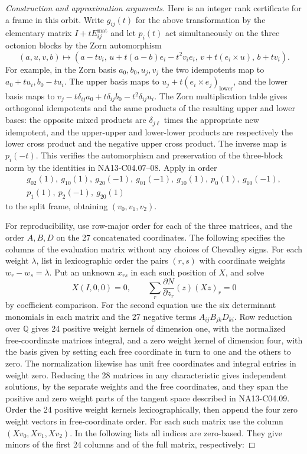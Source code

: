 \documentclass[11pt,a4paper,openany,oneside]{book}
\theoremstyle{resultstyle}
\theoremstyle{definition}
\numberwithin{equation}{chapter}
\begin{document}
\begin{proof}[Construction and approximation arguments]
Here is an integer rank certificate for a frame in this orbit.
Write \(g_{ij}(t)\) for the above transformation by the elementary
matrix \(I+tE^{\mathrm{mat}}_{ij}\) and let \(p_i(t)\) act
simultaneously on the three octonion blocks by the Zorn
automorphism
\[
 (a,u,v,b)\longmapsto
 \left(a-tv_i,\,
   u+t(a-b)e_i-t^2v_i e_i,\,
   v+t(e_i\times u),\, b+tv_i\right).
\]
For example, in the Zorn basis \(a_0,b_0,u_j,v_j\) the two
idempotents map to \(a_0+t u_i,b_0-t u_i\). The upper basis
maps to \(u_j+t(e_i\times e_j)_{\mathrm{lower}}\), and the lower
basis maps to \(v_j-t\delta_{ij}a_0+t\delta_{ij}b_0-
t^2\delta_{ij}u_i\). The Zorn multiplication table gives
orthogonal idempotents and the same products of the resulting
upper and lower bases: the opposite mixed products are
\(\delta_{j\ell}\) times the appropriate new idempotent,
and the upper-upper and lower-lower products are respectively
the lower cross product and the negative upper cross product.
The inverse map is \(p_i(-t)\). This verifies the automorphism
and preservation of the three-block norm by the identities in
NA13-C04.07--08. Apply in order
\[
\begin{gathered}
 g_{02}(1),\ g_{10}(1),\ g_{20}(-1),\ g_{01}(-1),\
 g_{10}(1),\ p_0(1),\ g_{10}(-1),\\
 p_1(1),\ p_2(-1),\ g_{20}(1)
\end{gathered}
\]
to the split frame, obtaining \((v_0,v_1,v_2)\).

For reproducibility, use row-major order for each of the three
matrices, and the order \(A,B,D\) on the 27 concatenated coordinates.
The following specifies the columns of the evaluation matrix without
any choices of Chevalley signs. For each weight \(\lambda\), list in
lexicographic order the pairs \((r,s)\) with coordinate weights
\(w_r-w_s=\lambda\). Put an unknown \(x_{rs}\) in each such position of
\(X\), and solve
\[
 X(I,0,0)=0,\qquad \sum_r \frac{\partial N}{\partial z_r}(z)
 (Xz)_r=0
\]
by coefficient comparison. For the second equation use the six
determinant monomials in each matrix and the 27 negative terms
\(A_{ij}B_{jk}D_{ki}\). Row reduction over \(\mathbb{Q}\) gives
24 positive weight kernels of dimension one, with the normalized
free-coordinate matrices integral, and a zero weight kernel of
dimension four, with the basis given by setting each free coordinate
in turn to one and the others to zero. The normalization likewise
has unit free coordinates and integral entries in weight zero.
Reducing the 28 matrices in any characteristic gives independent
solutions, by the separate weights and the free coordinates, and
they span the positive and zero weight parts of the tangent space
described in NA13-C04.09. Order the 24 positive weight kernels
lexicographically, then append the four zero weight vectors in
free-coordinate order. For each such matrix use the column
\((Xv_0,Xv_1,Xv_2)\). In the following lists all indices are
zero-based. They give minors of the first 24 columns and of the
full matrix, respectively:


\end{proof}
\end{document}
